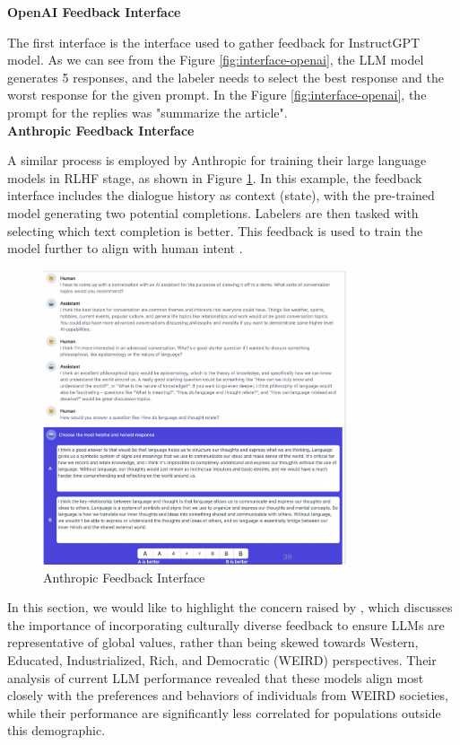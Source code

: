 \textbf{OpenAI Feedback Interface}

The first interface is the interface used to gather feedback for InstructGPT model. As we can see from the Figure 
\ref{fig:interface-openai}, the LLM model generates 5 responses, and the labeler 
needs to select the best response and the worst response for the given prompt. In the Figure \ref{fig:interface-openai}, the prompt for the replies was "summarize the article". \\


\textbf{Anthropic Feedback Interface}


A similar process is employed by Anthropic for training their large language models in RLHF stage, as shown in Figure \ref{fig:interface-anthropic}. In this example, the feedback interface includes the dialogue history as context (state), with the pre-trained model generating two potential completions. Labelers are then tasked with selecting which text completion is better. This feedback is used to train the model further to align with human intent \cite{baiConstitutionalAIHarmlessness2022}. \\


\begin{figure}[h]
    \centering
    \includegraphics[width=0.8\textwidth]{./figures/interfcae_antropic.png}
    \caption{Anthropic Feedback Interface}
    \label{fig:interface-anthropic}
\end{figure}



In this section, we would like to highlight the concern raised by \cite{atariWhichHumans2023}, which discusses 
the importance of incorporating culturally diverse feedback to ensure LLMs are representative of global values, rather than being skewed towards Western, Educated, Industrialized, Rich, and Democratic (WEIRD) perspectives. Their analysis of current LLM performance revealed that these models align most closely with the preferences and behaviors of individuals from WEIRD societies, while their performance are significantly less correlated for populations outside this demographic.
